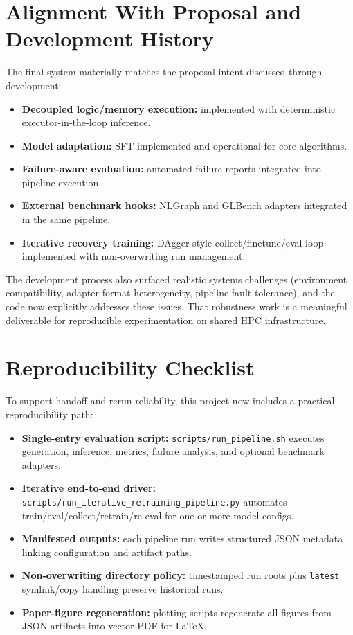 \documentclass[sigplan,screen]{acmart}
\begin{document}
\section{Alignment With Proposal and Development History}
The final system materially matches the proposal intent discussed through development:
\begin{itemize}
  \item \textbf{Decoupled logic/memory execution:} implemented with deterministic executor-in-the-loop inference.
  \item \textbf{Model adaptation:} SFT implemented and operational for core algorithms.
  \item \textbf{Failure-aware evaluation:} automated failure reports integrated into pipeline execution.
  \item \textbf{External benchmark hooks:} NLGraph and GLBench adapters integrated in the same pipeline.
  \item \textbf{Iterative recovery training:} DAgger-style collect/finetune/eval loop implemented with non-overwriting run management.
\end{itemize}

The development process also surfaced realistic systems challenges (environment compatibility, adapter format heterogeneity, pipeline fault tolerance), and the code now explicitly addresses these issues.
That robustness work is a meaningful deliverable for reproducible experimentation on shared HPC infrastructure.

\section{Reproducibility Checklist}
To support handoff and rerun reliability, this project now includes a practical reproducibility path:
\begin{itemize}
  \item \textbf{Single-entry evaluation script:} \texttt{scripts/run\_pipeline.sh} executes generation, inference, metrics, failure analysis, and optional benchmark adapters.
  \item \textbf{Iterative end-to-end driver:} \texttt{scripts/run\_iterative\_retraining\_pipeline.py} automates train/eval/collect/retrain/re-eval for one or more model configs.
  \item \textbf{Manifested outputs:} each pipeline run writes structured JSON metadata linking configuration and artifact paths.
  \item \textbf{Non-overwriting directory policy:} timestamped run roots plus \texttt{latest} symlink/copy handling preserve historical runs.
  \item \textbf{Paper-figure regeneration:} plotting scripts regenerate all figures from JSON artifacts into vector PDF for LaTeX.
\end{itemize}
\end{document}
